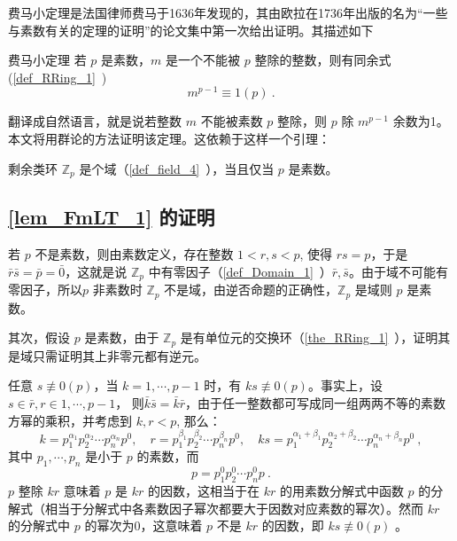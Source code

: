 费马小定理是法国律师费马于1636年发现的，其由欧拉在1736年出版的名为“一些与素数有关的定理的证明”的论文集中第一次给出证明。其描述如下
\begin{theorem}{费马小定理}\label{the_FmLT_1}
若 $p$ 是素数，$m$ 是一个不能被 $p$ 整除的整数，则有同余式(\autoref{def_RRing_1}~)
\begin{equation}
m^{p-1}\equiv 1(p)~.
\end{equation}
\end{theorem}
翻译成自然语言，就是说若整数 $m$ 不能被素数 $p$ 整除，则 $p$ 除 $m^{p-1}$ 余数为1。本文将用群论的方法证明该定理。这依赖于这样一个引理：
\begin{lemma}{}\label{lem_FmLT_1}
剩余类环 $\mathbb Z_p$ 是个域（\autoref{def_field_4}~），当且仅当 $p$ 是素数。
\end{lemma}
\subsection{\autoref{lem_FmLT_1} 的证明}\label{sub_FmLT_1}
若 $p$ 不是素数，则由素数定义，存在整数 $1<r,s<p$, 使得 $rs=p$，于是 $\bar r\bar s=\bar p=\bar 0$，这就是说 $\mathbb Z_p$ 中有零因子（\autoref{def_Domain_1}~）$\bar r,\bar s$。由于域不可能有零因子，所以$p$ 非素数时 $\mathbb Z_p$ 不是域，由逆否命题的正确性，$\mathbb Z_p$ 是域则 $p$ 是素数。

其次，假设 $p$ 是素数，由于 $\mathbb Z_p$ 是有单位元的交换环（\autoref{the_RRing_1}~），证明其是域只需证明其上非零元都有逆元。

任意 $s\not\equiv 0(p)$，当 $k=1,\cdots,p-1$ 时，有 $ks\not\equiv 0(p)$。事实上，设 $s\in\bar r, r\in{1,\cdots,p-1}$， 则$\bar k\bar s=\bar k\bar r$，由于任一整数都可写成同一组两两不等的素数方幂的乘积，并考虑到 $k,r<p$, 那么：
\begin{equation}
k=p_1^{\alpha_1}p_2^{\alpha_2}\cdots p_n^{\alpha_n}p^0, \quad r=p_1^{\beta_1}p_2^{\beta_2}\cdots p_n^{\beta_n}p^0,\quad ks=p_1^{\alpha_1+\beta_1}p_2^{\alpha_2+\beta_2}\cdots p_n^{\alpha_n+\beta_n}p^0~,
\end{equation}
其中 $p_1,\cdots,p_n$ 是小于 $p$ 的素数，而
\begin{equation}
p=p_1^0p_2^0\cdots p_n^{0}p~.
\end{equation}
$p$ 整除 $kr$ 意味着 $p$ 是 $kr$ 的因数，这相当于在 $kr$ 的用素数分解式中函数 $p$ 的分解式（相当于分解式中各素数因子幂次都要大于因数对应素数的幂次）。然而 $kr$ 的分解式中 $p$ 的幂次为0，这意味着 $p$ 不是 $kr$ 的因数，即 $ks\not\equiv 0(p)$ 。

